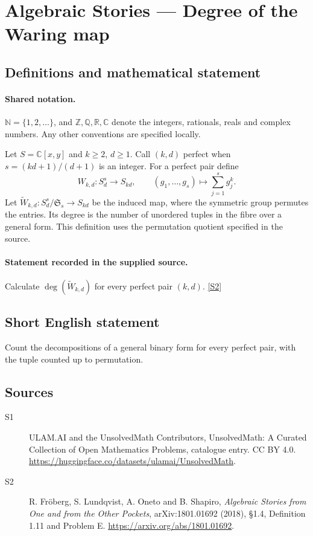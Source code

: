 \documentclass[11pt]{article}
\newcommand{\sref}[2]{\hyperlink{source:#1:#2}{[S#2]}}
\begin{document}
\section{Algebraic Stories — Degree of the Waring map}\label{statement}

\subsection{Definitions and mathematical statement}

\paragraph{Shared notation.}$\mathbb N=\{1,2,\ldots\}$, and $\mathbb Z,\mathbb Q,\mathbb R,\mathbb C$ denote the integers, rationals, reals and complex numbers. Any other conventions are specified locally.


Let $S=\mathbb C[x,y]$ and $k\geq2$, $d\geq1$. Call $(k,d)$ perfect when $s=(kd+1)/(d+1)$ is an integer. For a perfect pair define
\[W_{k,d}:S_d^s\longrightarrow S_{kd},\qquad(g_1,\ldots,g_s)\longmapsto\sum_{j=1}^sg_j^k.
\]
Let $\widetilde W_{k,d}:S_d^s/\mathfrak S_s\to S_{kd}$ be the induced map, where the symmetric group permutes the entries. Its degree is the number of unordered tuples in the fibre over a general form. This definition uses the permutation quotient specified in the source.
\paragraph{Statement recorded in the supplied source.}
Calculate $\deg(\widetilde W_{k,d})$ for every perfect pair $(k,d)$. \sref{statement}{2}
\subsection{Short English statement}
Count the decompositions of a general binary form for every perfect pair, with the tuple counted up to permutation.
\subsection{Sources}
\begin{description}
\item[\hypertarget{source:statement:1}{S1}] ULAM.AI and the UnsolvedMath Contributors, UnsolvedMath: A Curated Collection of Open Mathematics Problems, catalogue entry. CC BY 4.0. \url{https://huggingface.co/datasets/ulamai/UnsolvedMath}.
\item[\hypertarget{source:statement:2}{S2}] R. Fröberg, S. Lundqvist, A. Oneto and B. Shapiro, \emph{Algebraic Stories from One and from the Other Pockets}, arXiv:1801.01692 (2018), §1.4, Definition 1.11 and Problem E. \url{https://arxiv.org/abs/1801.01692}.
\end{description}
\label{end:statement}
\end{document}
